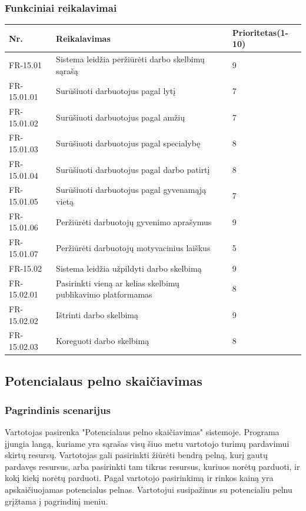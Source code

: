 \documentclass[oneside]{VUMIFPSkursinis}
\begin{document}
	\subsubsection{Funkciniai reikalavimai}
\begin{table}[htbp]
	\begin{tabularx}{1\textwidth}{ |P{2.5cm}|X|P{3cm }| }  \hline
		Nr. & Reikalavimas & Prioritetas(1-10) \\ \hline
		FR-15.01 & Sistema leidžia peržiūrėti darbo skelbimų sąrašą & 9 \\ \hline
		FR-15.01.01 & Surūšiuoti darbuotojus pagal lytį & 7 \\ \hline
		FR-15.01.02 & Surūšiuoti darbuotojus pagal amžių & 7 \\ \hline
		FR-15.01.03 & Surūšiuoti darbuotojus pagal specialybę & 8  \\ \hline
		FR-15.01.04 & Surūšiuoti darbuotojus pagal darbo patirtį & 8 \\ \hline
		FR-15.01.05 & Surūšiuoti darbuotojus pagal gyvenamąją vietą & 7 \\ \hline
		FR-15.01.06 & Peržiūrėti darbuotojų gyvenimo aprašymus & 9 \\ \hline
		FR-15.01.07 & Peržiūrėti darbuotojų motyvacinius laiškus & 5 \\ \hline
		FR-15.02 & Sistema leidžia užpildyti darbo skelbimą & 9 \\ \hline
		FR-15.02.01 & Pasirinkti vieną ar kelias skelbimų publikavimo platformamas & 8 \\ \hline
		FR-15.02.02 & Ištrinti darbo skelbimą & 9 \\ \hline
		FR-15.02.03 & Koreguoti darbo skelbimą & 8 \\ \hline
	\end{tabularx}
\end{table}	

\subsection{Potencialaus pelno skaičiavimas}
	\subsubsection{Pagrindinis scenarijus}
	Vartotojas pasirenka "Potencialaus pelno skaičiavimas" sistemoje. Programa įjungia langą, kuriame yra sąrašas visų šiuo metu vartotojo turimų pardavimui skirtų resursų. Vartotojas gali pasirinkti žiūrėti bendrą pelną, kurį gautų pardavęs resursus, arba pasirinkti tam tikrus resursus, kuriuos norėtų parduoti, ir kokį kiekį norėtų parduoti. Pagal vartotojo pasirinkimą ir rinkos kainą yra apskaičiuojamas potencialus pelnas. Vartotojui susipažinus su potencialiu pelnu grįžtama į pagrindinį meniu.
\end{document}
